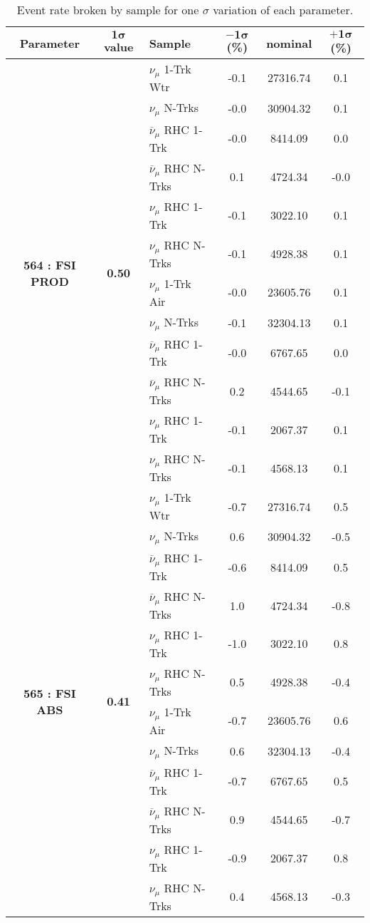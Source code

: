 \addtocounter{table}{-1}
\newpage
\begin{table}[ht!]
\centering
\begin{tabular}{ c  c  l  c  c  c }
\midrule[1.3pt]
\textbf{Parameter} & \textbf{$\mathbf{1\sigma}$ value} & \textbf{Sample} & \textbf{$\mathbf{-1\sigma}$ (\%)}  &  \textbf{nominal}  &  \textbf{$\mathbf{+1\sigma}$ (\%)} \\
\midrule[1.3pt]
\multirow{12}{*}{\textbf{564 : FSI PROD}} & \multirow{12}{*}{\textbf{0.50}} & $\nu_\mu$ 1-Trk Wtr &   -0.1 &  27316.74 &   0.1 \\ 
 &  & $\nu_\mu$ N-Trks &   -0.0 &  30904.32 &   0.1 \\ 
 &  & $\overline{\nu}_\mu$ RHC 1-Trk &   -0.0 &  8414.09 &   0.0 \\ 
 &  & $\overline{\nu}_\mu$ RHC N-Trks &   0.1 &  4724.34 &   -0.0 \\ 
 &  & $\nu_\mu$ RHC 1-Trk &   -0.1 &  3022.10 &   0.1 \\ 
 &  & $\nu_\mu$ RHC N-Trks &   -0.1 &  4928.38 &   0.1 \\ 
 &  & $\nu_\mu$ 1-Trk Air &   -0.0 &  23605.76 &   0.1 \\ 
 &  & $\nu_\mu$ N-Trks &   -0.1 &  32304.13 &   0.1 \\ 
 &  & $\overline{\nu}_\mu$ RHC 1-Trk &   -0.0 &  6767.65 &   0.0 \\ 
 &  & $\overline{\nu}_\mu$ RHC N-Trks &   0.2 &  4544.65 &   -0.1 \\ 
 &  & $\nu_\mu$ RHC 1-Trk &   -0.1 &  2067.37 &   0.1 \\ 
 &  & $\nu_\mu$ RHC N-Trks &   -0.1 &  4568.13 &   0.1 \\ 
\midrule[1.3pt]
\multirow{12}{*}{\textbf{565 : FSI ABS}} & \multirow{12}{*}{\textbf{0.41}} & $\nu_\mu$ 1-Trk Wtr &   -0.7 &  27316.74 &   0.5 \\ 
 &  & $\nu_\mu$ N-Trks &   0.6 &  30904.32 &   -0.5 \\ 
 &  & $\overline{\nu}_\mu$ RHC 1-Trk &   -0.6 &  8414.09 &   0.5 \\ 
 &  & $\overline{\nu}_\mu$ RHC N-Trks &   1.0 &  4724.34 &   -0.8 \\ 
 &  & $\nu_\mu$ RHC 1-Trk &   -1.0 &  3022.10 &   0.8 \\ 
 &  & $\nu_\mu$ RHC N-Trks &   0.5 &  4928.38 &   -0.4 \\ 
 &  & $\nu_\mu$ 1-Trk Air &   -0.7 &  23605.76 &   0.6 \\ 
 &  & $\nu_\mu$ N-Trks &   0.6 &  32304.13 &   -0.4 \\ 
 &  & $\overline{\nu}_\mu$ RHC 1-Trk &   -0.7 &  6767.65 &   0.5 \\ 
 &  & $\overline{\nu}_\mu$ RHC N-Trks &   0.9 &  4544.65 &   -0.7 \\ 
 &  & $\nu_\mu$ RHC 1-Trk &   -0.9 &  2067.37 &   0.8 \\ 
 &  & $\nu_\mu$ RHC N-Trks &   0.4 &  4568.13 &   -0.3 \\ 
\midrule[1.3pt]
\end{tabular}
\centering
\caption{Event rate broken by sample for one $\sigma$ variation of each parameter.}
\end{table}
